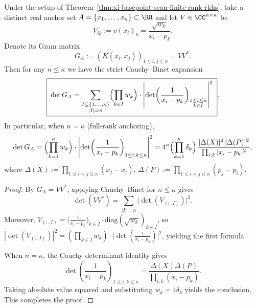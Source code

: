 \begin{proposition}\label{prop:xi-basepoint-scan-anchor-det-cauchy-vandermonde}
Under the setup of Theorem~\ref{thm:xi-basepoint-scan-finite-rank-rkhs}, take a distinct real anchor set
\(
A=\{x_1,\dots,x_n\}\subset\RR
\)
and let \(V\in\CC^{n\times\kappa}\) be
\[
V_{ik}:=v(x_i)_k=\frac{\sqrt{w_k}}{x_i-p_k}.
\]
Denote its Gram matrix
\[
G_A:=(K(x_i,x_j))_{1\le i,j\le n}=VV^\ast.
\]
Then for any \(n\le \kappa\) we have the strict Cauchy--Binet expansion
\[
\boxed{\;
\det G_A
=\sum_{\substack{I\subseteq\{1,\dots,\kappa\}\\ |I|=n}}
\Bigl(\prod_{k\in I}w_k\Bigr)\cdot
\left|\det\!\left(\frac{1}{x_i-p_k}\right)_{\substack{1\le i\le n\\ k\in I}}\right|^2\; }.
\]
In particular, when \(n=\kappa\) (full-rank anchoring),
\[
\det G_A=\Bigl(\prod_{k=1}^{\kappa}w_k\Bigr)\cdot
\left|\det\!\left(\frac{1}{x_i-p_k}\right)_{1\le i,k\le\kappa}\right|^2
=4^\kappa\Bigl(\prod_{k=1}^{\kappa}\delta_k\Bigr)\,
\frac{|\Delta(X)|^2\,|\Delta(P)|^2}{\prod_{i,k}|x_i-p_k|^2},
\]
where \(\Delta(X):=\prod_{1\le i<j\le \kappa}(x_j-x_i)\), \(\Delta(P):=\prod_{1\le i<j\le \kappa}(p_j-p_i)\).
\end{proposition}
\begin{proof}
By \(G_A=VV^\ast\), applying Cauchy--Binet for \(n\le\kappa\) gives
\[
\det(VV^\ast)
=\sum_{|I|=n}\bigl|\det(V_{(:,I)})\bigr|^2.
\]
Moreover, \(V_{(:,I)}=\bigl(\frac{1}{x_i-p_k}\bigr)_{k\in I}\cdot \mathrm{diag}(\sqrt{w_k})_{k\in I}\), so
\(
|\det(V_{(:,I)})|^2
=(\prod_{k\in I}w_k)\cdot\bigl|\det(\frac{1}{x_i-p_k})\bigr|^2
\), yielding the first formula.
\par
When \(n=\kappa\), the Cauchy determinant identity gives
\[
\det\!\left(\frac{1}{x_i-p_k}\right)_{1\le i,k\le\kappa}
=\frac{\Delta(X)\Delta(P)}{\prod_{i,k}(x_i-p_k)}.
\]
Taking absolute value squared and substituting \(w_k=4\delta_k\) yields the conclusion. This completes the proof.
\end{proof}

